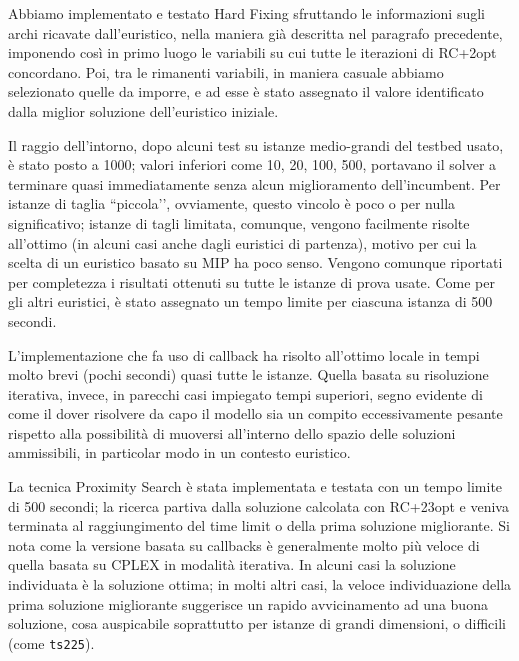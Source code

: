 Abbiamo implementato e testato Hard Fixing sfruttando le informazioni sugli archi ricavate dall’euristico, nella maniera già descritta nel paragrafo precedente, imponendo così in primo luogo le variabili su cui tutte le iterazioni di RC+2opt concordano. Poi, tra le rimanenti variabili, in maniera casuale abbiamo selezionato quelle da imporre, e ad esse è stato assegnato il valore identificato dalla miglior soluzione dell’euristico iniziale.

Il raggio dell’intorno, dopo alcuni test su istanze medio-grandi del testbed usato, è stato posto a 1000; valori inferiori come 10, 20, 100, 500, portavano il solver a terminare quasi immediatamente senza alcun miglioramento dell’incumbent. Per istanze di taglia ``piccola’’, ovviamente, questo vincolo è poco o per nulla significativo; istanze di tagli limitata, comunque, vengono facilmente risolte all’ottimo (in alcuni casi anche dagli euristici di partenza), motivo per cui la scelta di un euristico basato su MIP ha poco senso. Vengono comunque riportati per completezza i risultati ottenuti su tutte le istanze di prova usate. Come per gli altri euristici, è stato assegnato un tempo limite per ciascuna istanza di 500 secondi.

L’implementazione che fa uso di callback ha risolto all’ottimo locale in tempi molto brevi (pochi secondi) quasi tutte le istanze. Quella basata su risoluzione iterativa, invece, in parecchi casi impiegato tempi superiori, segno evidente di come il dover risolvere da capo il modello sia un compito eccessivamente pesante rispetto alla possibilità di muoversi all’interno dello spazio delle soluzioni ammissibili, in particolar modo in un contesto euristico.


La tecnica Proximity Search è stata implementata e testata con un tempo limite di 500 secondi; la ricerca partiva dalla soluzione calcolata con RC+23opt e veniva terminata al raggiungimento del time limit o della prima soluzione migliorante. Si nota come la versione basata su callbacks è generalmente molto più veloce di quella basata su CPLEX in modalità iterativa. In alcuni casi la soluzione individuata è la soluzione ottima; in molti altri casi, la veloce individuazione della prima soluzione migliorante suggerisce un rapido avvicinamento ad una buona soluzione, cosa auspicabile soprattutto per istanze di grandi dimensioni, o difficili (come \texttt{ts225}).

